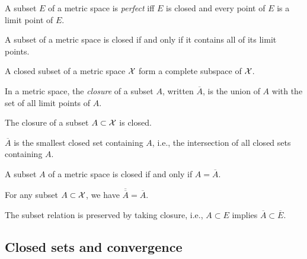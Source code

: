 \begin{defn}
  \label{def:perfectSets}
  A subset $E$ of a metric space is \emph{perfect}
  iff $E$ is closed and every point of $E$
  is a limit point of $E$.
\end{defn}

\begin{lem}
  \label{lem:closedSetsContainsAllLimitPoints}
  A subset of a metric space is closed
  if and only if it contains all of its limit points.
\end{lem}

\begin{coro}
  \label{coro:closedSubsetIsComplete}
  A closed subset of a metric space ${\cal X}$
  form a complete subspace of ${\cal X}$.
\end{coro}

\begin{defn}
  \label{def:closureInMetricSpace}
  In a metric space, 
  the \emph{closure} of a subset $A$,
  written $\overline{A}$,
  is the union of $A$ with the set of all limit points of $A$. 
\end{defn}

\begin{lem}
  \label{lem:closureIsClosed}
  The closure of a subset $A\subset{\cal X}$ is closed.
\end{lem}

\begin{coro}
  \label{coro:closureBeingSmallest}
  $\overline{A}$ is the smallest closed set containing $A$, 
  i.e., the intersection of all closed sets containing $A$.
\end{coro}

\begin{coro}
  \label{coro:closedFromClosure}
  A subset $A$ of a metric space is closed
  if and only if $A=\overline{A}$.
\end{coro}

\begin{coro}
  \label{coro:closureIdempotence}
  For any subset $A\subset {\cal X}$,
  we have $\overline{\overline{A}}=\overline{A}$. 
\end{coro}

\begin{coro}
  \label{coro:closurePreserveSubset}
  The subset relation is preserved by taking closure, 
  i.e., $A\subset E$ implies $\overline{A}\subset \overline{E}$.
\end{coro}

\subsection{Closed sets and convergence}
\label{sec:clos-sets-conv}

